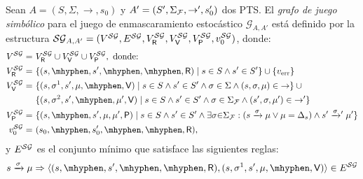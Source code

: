 \begin{definition} \label{def:symbolic_game_graph}
  Sean $A = ( S, \Sigma, {\rightarrow}, s_0 )$
  y $A' = ( S', \Sigma_{\mathcal{F}}, {\rightarrow'}, s'_0 )$
  dos PTS.
  El \emph{grafo de juego simbólico} para el juego de enmascaramiento estocástico
  $\mathcal{G}_{A,A'}$ está definido por la estructura
  $\mathcal{SG}_{A,A'} = ( V^{\mathcal{SG}}, E^{\mathcal{SG}}, V^{\mathcal{SG}}_{\mathsf{R}}, V^{\mathcal{SG}}_{\mathsf{V}}, V^{\mathcal{SG}}_{\mathsf{P}}, v_0^{\mathcal{SG}} )$,
  donde:
  {\small%
  \begin{align*}
    V^\SymbG = \
    & V^\SymbG_\Refuter \cup V^\SymbG_\Verifier \cup V^\SymbG_\Probabilistic, \text{ donde: }\\
    V^\SymbG_\Refuter = \
    & \{ (s, \mhyphen, s', \mhyphen, \mhyphen, \Refuter) \mid
          s \in S \wedge s' \in S' \} \cup
      \{\ErrorSt\}\\
    V^\SymbG_\Verifier = \
    & \{ (s, \sigma^1, s', \mu, \mhyphen, \Verifier) \mid
         s \in S \wedge s' \in S'
         \wedge \sigma \in \Sigma
         \wedge (s, \sigma, \mu) \in {\rightarrow} \} \cup {} \\
    & \{ (s, \sigma^2, s', \mhyphen, \mu', \Verifier) \mid
         s \in S \wedge s' \in S'
         \wedge \sigma \in \SigmaF
          \wedge (s', \sigma, \mu') \in {\rightarrow'} \} \\
    V^\SymbG_\Probabilistic = \
    & \{ (s, \mhyphen, s', \mu, \mu', \Probabilistic) \mid
         s \in S \wedge s' \in S' \wedge
         \exists \sigma{\in}\SigmaF : (s\xrightarrow{\sigma}\mu \vee \mu=\Dirac_s) \wedge s'\xrightarrowprime{\sigma}\mu'\}\\
    v_0^{\SymbG} = \
    & ( s_0, \mhyphen, s'_0, \mhyphen, \mhyphen, \Refuter ),
  \end{align*}
  }%
%
  y $E^{\mathcal{SG}}$ es el conjunto mínimo que satisface las siguientes reglas:
%
  {\small%
  \begin{align*}
    s \xrightarrow{\sigma} \mu
    & \Rightarrow \tuple{(s, \mhyphen, s', \mhyphen, \mhyphen, \Refuter), (s, \sigma^{1}, s', \mu, \mhyphen, \Verifier)}\in E^\SymbG \\

\end{align*}}
\end{definition}
